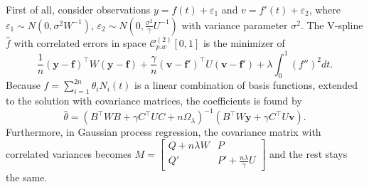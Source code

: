 First of all, consider observations $y=f(t)+\varepsilon_1$ and $v=f'(t)+\varepsilon_2$, where $\varepsilon_1\sim N\left(0,\sigma^2W^{-1}\right)$, $\varepsilon_2\sim N\left(0,\frac{\sigma^2}{\gamma}U^{-1}\right)$ with variance parameter $\sigma^2$. The V-spline $\hat{f}$ with correlated errors in space $\mathcal{C}_{p.w}^{(2)}[0,1]$ is the minimizer of 
\begin{equation}
\frac{1}{n}\left(\mathbf{y}-\mathbf{f}\right)^\top W\left(\mathbf{y}-\mathbf{f}\right)+\frac{\gamma}{n}\left(\mathbf{v}-\mathbf{f}'\right)^\top U\left(\mathbf{v}-\mathbf{f}'\right)+\lambda\int_0^1\left(f''\right)^2dt.
\end{equation}
Because $f=\sum_{i=1}^{2n}\theta_iN_i\left(t\right)$ is a linear combination of basis functions, extended to the solution with covariance matrices, the coefficients is found by 
\begin{equation}
\hat{\theta}=\left(B^\top W B+ \gamma C^\top UC+n\Omega_\lambda\right)^{-1}\left(B^\top W \mathbf{y}+\gamma C^\top U\mathbf{v}\right).
\end{equation}
Furthermore, in Gaussian process regression, the covariance matrix with correlated variances becomes 
$M=\begin{bmatrix}
Q+n\lambda W& P\\
Q'& P'+\frac{n\lambda}{\gamma}U
\end{bmatrix}$ and the rest stays the same. 


